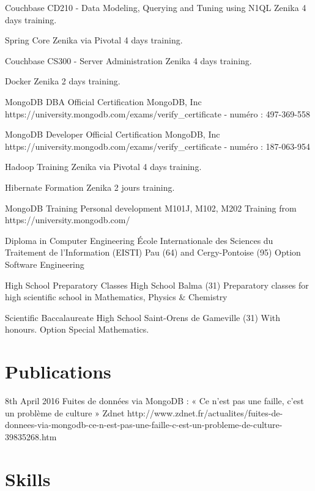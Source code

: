 \documentclass[11pt,a4paper]{moderncv}
\begin{document}
{Couchbase CD210 - Data Modeling, Querying and Tuning using N1QL}
{Zenika}
{}
{}
{4 days training.}

{Spring Core}
{Zenika via Pivotal}
{}
{}
{4 days training.}

{Couchbase CS300 - Server Administration}
{Zenika}
{}
{}
{4 days training.}

{Docker}
{Zenika}
{}
{}
{2 days training.}

{MongoDB DBA Official Certification}
{MongoDB, Inc}
{}
{}
{https://university.mongodb.com/exams/verify\_certificate - numéro : 497-369-558}

{MongoDB Developer Official Certification}
{MongoDB, Inc}
{}
{}
{https://university.mongodb.com/exams/verify\_certificate - numéro : 187-063-954}

{Hadoop Training}
{Zenika via Pivotal}
{}
{}
{4 days training.}

{Hibernate Formation}
{Zenika}
{}
{}
{2 jours training.}

{MongoDB Training}
{Personal development}
{}
{}
{M101J, M102, M202 Training from https://university.mongodb.com/}

{Diploma in Computer Engineering}
{\'Ecole Internationale des Sciences du Traitement de l’Information (EISTI)}
{Pau (64) and Cergy-Pontoise (95)}
{}
{Option Software Engineering}

{High School Preparatory Classes}
{High School}
{Balma (31)}
{}
{Preparatory classes for high scientific school in Mathematics, Physics \& Chemistry}

{Scientific Baccalaureate}
{High School}
{Saint-Orens de Gameville (31)}
{With honours.}
{Option Special Mathematics.}

\section{Publications}
\cventry
{8th April 2016}
{Fuites de données via MongoDB : « Ce n’est pas une faille, c’est un problème de culture »}
{}
{Zdnet}
{}
{http://www.zdnet.fr/actualites/fuites-de-donnees-via-mongodb-ce-n-est-pas-une-faille-c-est-un-probleme-de-culture-39835268.htm
}   %


\section{Skills}
\end{document}

